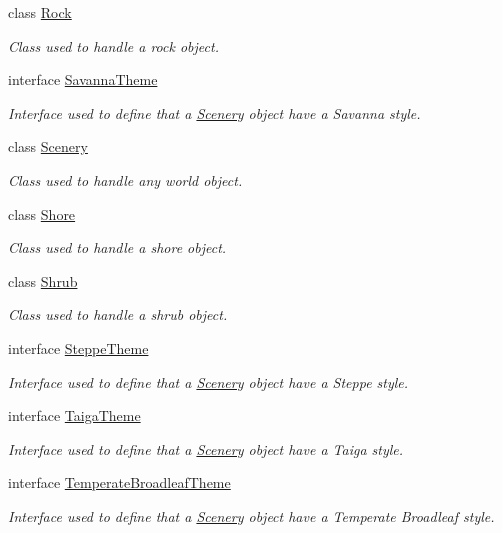 \begin{DoxyCompactItemize}
class \hyperlink{a00022}{Rock}
\begin{DoxyCompactList}\small\item\em Class used to handle a rock object. \end{DoxyCompactList}\item 
interface \hyperlink{a00023}{Savanna\-Theme}
\begin{DoxyCompactList}\small\item\em Interface used to define that a \hyperlink{a00024}{Scenery} object have a Savanna style. \end{DoxyCompactList}\item 
class \hyperlink{a00024}{Scenery}
\begin{DoxyCompactList}\small\item\em Class used to handle any world object. \end{DoxyCompactList}\item 
class \hyperlink{a00025}{Shore}
\begin{DoxyCompactList}\small\item\em Class used to handle a shore object. \end{DoxyCompactList}\item 
class \hyperlink{a00026}{Shrub}
\begin{DoxyCompactList}\small\item\em Class used to handle a shrub object. \end{DoxyCompactList}\item 
interface \hyperlink{a00027}{Steppe\-Theme}
\begin{DoxyCompactList}\small\item\em Interface used to define that a \hyperlink{a00024}{Scenery} object have a Steppe style. \end{DoxyCompactList}\item 
interface \hyperlink{a00028}{Taiga\-Theme}
\begin{DoxyCompactList}\small\item\em Interface used to define that a \hyperlink{a00024}{Scenery} object have a Taiga style. \end{DoxyCompactList}\item 
interface \hyperlink{a00030}{Temperate\-Broadleaf\-Theme}
\begin{DoxyCompactList}\small\item\em Interface used to define that a \hyperlink{a00024}{Scenery} object have a Temperate Broadleaf style. \end{DoxyCompactList}\item 

\end{DoxyCompactItemize}
